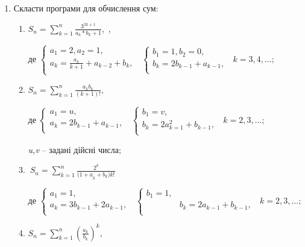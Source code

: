 \documentclass[]{article}
\makeatletter
\newcommand{\xslalph}[1]{\expandafter\@xslalph\csname c@#1\endcsname}
\newcommand{\@xslalph}[1]{%
    \ifcase#1\or а\or б\or в\or г\or д\or e\or є\or ж\or з\or i%
    \or й\or к\or л\or м\or н\or о\or п\or р\or с\or т%
    \or у\or ф\or х\or ц\or ч\or ш\or ю\or я\or аа\or бб\or вв%
    \else\@ctrerr\fi%
}
\makeatother
\begin{document}
\begin{enumerate}
\begin{enumerate}[label=\xslalph*)]
\end{enumerate}

\item
  Скласти програми для обчислення сум:
\begin{enumerate}[label=\xslalph*)]
\item \(S_{n} = \sum_{k = 1}^{n}\frac{3^{2k + 1}}{a_{k}*b_{k} + 1},\) ,

де \(\left\{ \begin{matrix}
 a_{1} = 2,a_{2} = 1, \\
 a_{k} = \frac{a_{k}}{k + 1} + a_{k - 2} + b_{k}, \\
\end{matrix} \right.\ \) \(\left\{ \begin{matrix}
 b_{1} = 1,b_{2} = 0, \\
 b_{k} = 2b_{k - 1} + a_{k - 1}, \\
\end{matrix} \right.\ \) \(k = 3,4,\ldots;\)

\item \(S_{n} = \sum_{k = 1}^{n}\frac{a_{k}b_{k}}{(k + 1)!},\)

де \(\left\{ \begin{matrix}
 a_{1} = u, \\
 a_{k} = 2b_{k - 1} + a_{k - 1}, \\
\end{matrix} \right.\ \) \(\left\{ \begin{matrix}
 b_{1} = v, \\
 b_{k} = 2a_{k = 1}^{2} + b_{k - 1}, \\
\end{matrix} \right.\ \) \(k = 2,3,\ldots;\)

\emph{u,v} -- задані дійсні числа;
\item
\(\ S_{n} = \sum_{k = 1}^{n}\frac{2^{k}}{{(1 + a}_{k} + b_{k}){k!}^{}}\)

де \(\left\{ \begin{matrix}
 a_{1} = 1, \\
 a_{k} = 3b_{k - 1} + 2a_{k - 1}, \\
\end{matrix} \right.\ \) \(\left\{ \begin{matrix}
 b_{1} = 1, \\
& b_{k} = 2a_{k - 1} + b_{k - 1}, \\
\end{matrix} \right.\ \) \(k = 2,3,\ldots;\)
\item \(S_{n} = \sum_{k = 1}^{n}\left( \frac{a_{k}}{b_{k}} \right)^{k},\)


\end{enumerate}
\end{enumerate}
\end{document}
